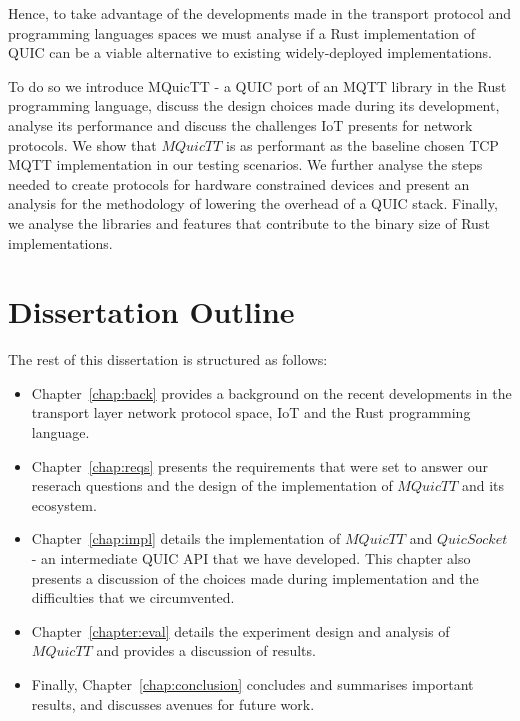 Hence, to take advantage of the developments made in the transport protocol and programming languages spaces we must analyse if a Rust implementation of QUIC can be a viable alternative to existing widely-deployed implementations.

To do so we introduce MQuicTT - a QUIC port of an MQTT library in the Rust programming language, discuss the design choices made during its development, analyse its performance and discuss the challenges IoT presents for network protocols.
We show that $MQuicTT$ is as performant as the baseline chosen TCP MQTT implementation in our testing scenarios.
We further analyse the steps needed to create protocols for hardware constrained devices and present an analysis for the methodology of lowering the overhead of a QUIC stack.
Finally, we analyse the libraries and features that contribute to the binary size of Rust implementations.

\section{Dissertation Outline}

The rest of this dissertation is structured as follows:
\begin{itemize}
    \item Chapter~\ref{chap:back} provides a background on the recent developments in the transport layer network protocol space, IoT and the Rust programming language.
    \item Chapter~\ref{chap:reqs} presents the requirements that were set to answer our reserach questions and the design of the implementation of $MQuicTT$ and its ecosystem.
    \item Chapter~\ref{chap:impl} details the implementation of $MQuicTT$ and $QuicSocket$ - an intermediate QUIC API that we have developed. This chapter also presents a discussion of the choices made during implementation and the difficulties that we circumvented.
    \item Chapter~\ref{chapter:eval} details the experiment design and analysis of $MQuicTT$ and provides a discussion of results.
    \item Finally, Chapter~\ref{chap:conclusion} concludes and summarises important results, and discusses avenues for future work.
\end{itemize}